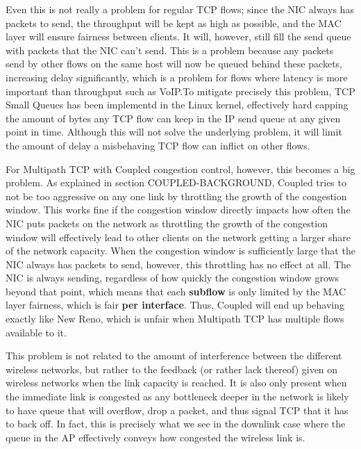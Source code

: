 Even this is not really a problem for regular TCP flows; since the NIC always
has packets to send, the throughput will be kept as high as possible, and the
MAC layer will ensure fairness between clients. It will, however, still fill the
send queue with packets that the NIC can't send. This is a problem because any
packets send by other flows on the same host will now be queued behind these
packets, increasing delay significantly, which is a problem for flows where
latency is more important than throughput such as VoIP.\@  To mitigate precisely
this problem, TCP Small Queues has been implementd in the Linux kernel,
effectively hard capping the amount of bytes any TCP flow can keep in the IP
send queue at any given point in time. Although this will not solve the
underlying problem, it will limit the amount of delay a misbehaving TCP flow can
inflict on other flows.

For Multipath TCP with Coupled congestion control, however, this becomes a big
problem. As explained in section COUPLED-BACKGROUND, Coupled tries to not be   %
too aggressive on any one link by throttling the growth of the congestion
window. This works fine if the congestion window directly impacts how often the
NIC puts packets on the network as throttling the growth of the congestion
window will effectively lead to other clients on the network getting a larger
share of the network capacity. When the congestion window is sufficiently large
that the NIC always has packets to send, however, this throttling has no effect
at all. The NIC is always sending, regardless of how quickly the congestion
window grows beyond that point, which means that each \textbf{subflow} is only
limited by the MAC layer fairness, which is fair \textbf{per interface}. Thus,
Coupled will end up behaving exactly like New Reno, which is unfair when
Multipath TCP has multiple flows available to it.

This problem is not related to the amount of interference between the different
wireless networks, but rather to the feedback (or rather lack thereof) given on
wireless networks when the link capacity is reached. It is also only present
when the immediate link is congested as any bottleneck deeper in the network is
likely to have queue that will overflow, drop a packet, and thus signal TCP that
it has to back off. In fact, this is precisely what we see in the downlink case
where the queue in the AP effectively conveys how congested the wireless link
is.

